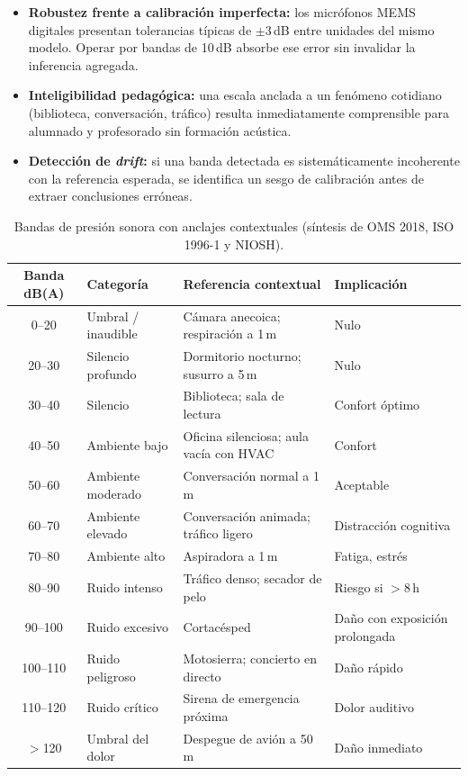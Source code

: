 \documentclass[11pt,a4paper,openany]{report}
\begin{document}
\begin{itemize}
    \item \textbf{Robustez frente a calibraci\'on imperfecta:} los micr\'ofonos MEMS digitales presentan tolerancias t\'ipicas de $\pm 3$\,dB entre unidades del mismo modelo. Operar por bandas de 10\,dB absorbe ese error sin invalidar la inferencia agregada.
    \item \textbf{Inteligibilidad pedag\'ogica:} una escala anclada a un fen\'omeno cotidiano (biblioteca, conversaci\'on, tr\'afico) resulta inmediatamente comprensible para alumnado y profesorado sin formaci\'on ac\'ustica.
    \item \textbf{Detecci\'on de \emph{drift}:} si una banda detectada es sistem\'aticamente incoherente con la referencia esperada, se identifica un sesgo de calibraci\'on antes de extraer conclusiones err\'oneas.
\end{itemize}

\begin{table}[H]
\centering
{}
\begin{tabularx}{\textwidth}{c l X l}
\toprule
\rowcolor{TableHead}
\textbf{Banda dB(A)} & \textbf{Categor\'ia} & \textbf{Referencia contextual} & \textbf{Implicaci\'on} \\ \midrule
0--20    & Umbral / inaudible & C\'amara anecoica; respiraci\'on a 1\,m & Nulo \\
20--30   & Silencio profundo  & Dormitorio nocturno; susurro a 5\,m   & Nulo \\
30--40   & Silencio           & Biblioteca; sala de lectura           & Confort \'optimo \\
40--50   & Ambiente bajo      & Oficina silenciosa; aula vac\'ia con HVAC & Confort \\
50--60   & Ambiente moderado  & Conversaci\'on normal a 1\,m            & Aceptable \\
60--70   & Ambiente elevado   & Conversaci\'on animada; tr\'afico ligero & Distracci\'on cognitiva \\
70--80   & Ambiente alto      & Aspiradora a 1\,m                       & Fatiga, estr\'es \\
80--90   & Ruido intenso      & Tr\'afico denso; secador de pelo        & Riesgo si $>$8\,h \\
90--100  & Ruido excesivo     & Cortac\'esped                           & Da\~no con exposici\'on prolongada \\
100--110 & Ruido peligroso    & Motosierra; concierto en directo        & Da\~no r\'apido \\
110--120 & Ruido cr\'itico    & Sirena de emergencia pr\'oxima          & Dolor auditivo \\
$>$120   & Umbral del dolor   & Despegue de avi\'on a 50\,m             & Da\~no inmediato \\ \bottomrule
\end{tabularx}
\caption{Bandas de presi\'on sonora con anclajes contextuales (s\'intesis de OMS 2018, ISO 1996-1 y NIOSH).}
\label{tab:bandas-ref}
\end{table}
\end{document}
